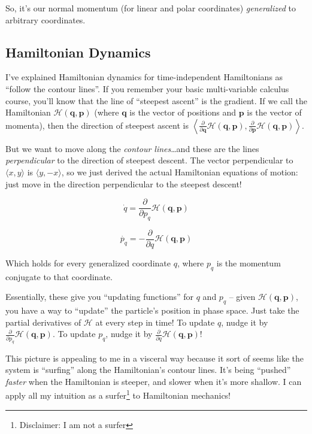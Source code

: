 \documentclass[]{article}
\begin{document}
So, it's our normal momentum (for linear and polar coordinates)
\emph{generalized} to arbitrary coordinates.

\subsection{Hamiltonian Dynamics}\label{hamiltonian-dynamics}

I've explained Hamiltonian dynamics for time-independent Hamiltonians as
``follow the contour lines''. If you remember your basic multi-variable calculus
course, you'll know that the line of ``steepest ascent'' is the gradient. If we
call the Hamiltonian \(\mathcal{H}(\mathbf{q},\mathbf{p})\) (where
\(\mathbf{q}\) is the vector of positions and \(\mathbf{p}\) is the vector of
momenta), then the direction of steepest ascent is
\(\left \langle \frac{\partial}{\partial \mathbf{q}} \mathcal{H}(\mathbf{q},\mathbf{p}), \frac{\partial}{\partial \mathbf{p}} \mathcal{H}(\mathbf{q},\mathbf{p}) \right \rangle\).

But we want to move along the \emph{contour lines}\ldots{}and these are the
lines \emph{perpendicular} to the direction of steepest descent. The vector
perpendicular to \(\langle x, y \rangle\) is \(\langle y, -x \rangle\), so we
just derived the actual Hamiltonian equations of motion: just move in the
direction perpendicular to the steepest descent!

\[
\dot{q} = \frac{\partial}{\partial p_q} \mathcal{H}(\mathbf{q},\mathbf{p})
\]

\[
\dot{p_q} = - \frac{\partial}{\partial q} \mathcal{H}(\mathbf{q},\mathbf{p})
\]

Which holds for every generalized coordinate \(q\), where \(p_q\) is the
momentum conjugate to that coordinate.

Essentially, these give you ``updating functions'' for \(q\) and \(p_q\) --
given \(\mathcal{H}(\mathbf{q},\mathbf{p})\), you have a way to ``update'' the
particle's position in phase space. Just take the partial derivatives of
\(\mathcal{H}\) at every step in time! To update \(q\), nudge it by
\(\frac{\partial}{\partial p_q} \mathcal{H}(\mathbf{q},\mathbf{p})\). To update
\(p_q\), nudge it by
\(\frac{\partial}{\partial q} \mathcal{H}(\mathbf{q},\mathbf{p})\)!

This picture is appealing to me in a visceral way because it sort of seems like
the system is ``surfing'' along the Hamiltonian's contour lines. It's being
``pushed'' \emph{faster} when the Hamiltonian is steeper, and slower when it's
more shallow. I can apply all my intuition as a surfer\footnote{Disclaimer: I am
  not a surfer} to Hamiltonian mechanics!
\end{document}
